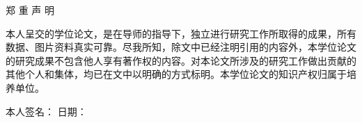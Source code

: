\begin{academicstatement}%
	郑 重 声 明
\end{academicstatement}

\begin{content}%
	本人呈交的学位论文，是在导师的指导下，独立进行研究工作所取得的成果，所有数据、图片资料真实可靠。尽我所知，除文中已经注明引用的内容外，本学位论文的研究成果不包含他人享有著作权的内容。对本论文所涉及的研究工作做出贡献的其他个人和集体，均已在文中以明确的方式标明。本学位论文的知识产权归属于培养单位。
	
	
	
	
	本人签名： \hspace{7cm}日期：
\end{content}